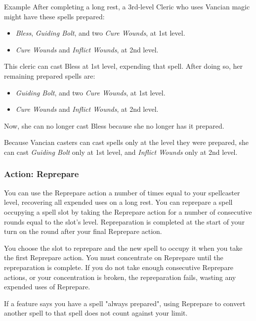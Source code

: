 \documentclass[letterpaper,twocolumn,openany,nodeprecatedcode,bg=print]{dndbook}
\begin{document}
\begin{DndComment}{Example}
After completing a long rest, a 3rd-level Cleric who uses Vancian magic might have these spells prepared:

\begin{itemize}
\item \textit{Bless}, \textit{Guiding Bolt}, and two \textit{Cure Wounds}, at 1st level.
\item \textit{Cure Wounds} and \textit{Inflict Wounds}, at 2nd level.
\end{itemize}

\noindent This cleric can cast Bless at 1st level, expending that spell. 
After doing so, her remaining prepared spells are:

\begin{itemize}
\item \textit{Guiding Bolt}, and two \textit{Cure Wounds}, at 1st level.
\item \textit{Cure Wounds} and \textit{Inflict Wounds}, at 2nd level.
\end{itemize}

\noindent Now, she can no longer cast Bless because she no longer has it prepared. 

Because Vancian casters can cast spells only at the level they were prepared, 
she can cast \textit{Guiding Bolt} only at 1st level, and \textit{Inflict Wounds} only at 2nd level.
\end{DndComment}

\subsubsection{Action: Reprepare}
You can use the Reprepare action a number of times equal to your spellcaster level, 
recovering all expended uses on a long rest. 
You can reprepare a spell occupying a spell slot by taking the Reprepare action for a number of consecutive rounds equal to the slot's level. 
Repreparation is completed at the start of your turn on the round after your final Reprepare action. 

You choose the slot to reprepare and the new spell to occupy it when you take the first Reprepare action. 
You must concentrate on Reprepare until the repreparation is complete. 
If you do not take enough consecutive Reprepare actions, or your concentration is broken, 
the repreparation fails, wasting any expended uses of Reprepare.

If a feature says you have a spell "always prepared", 
using Reprepare to convert another spell to that spell does not count against your limit.
\end{document}
